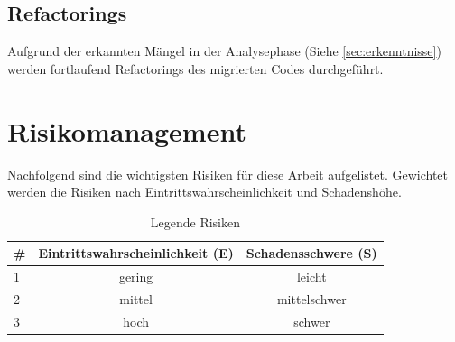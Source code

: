 \documentclass[11pt,a4paper,english,oneside]{book}
\numberwithin{equation}{chapter}
\begin{document}
	\subsection{Refactorings}
	Aufgrund der erkannten Mängel in der Analysephase (Siehe \ref{sec:erkenntnisse}) werden fortlaufend Refactorings des migrierten Codes durchgeführt.

	\section{Risikomanagement}
	Nachfolgend sind die wichtigsten Risiken für diese Arbeit aufgelistet. Gewichtet werden die Risiken nach Eintrittswahrscheinlichkeit und Schadenshöhe. \cite{risikomanagement}
	
	\begin{table}[h!]
		\centering
		\begin{tabular}{l c c}
			\toprule 
			\# & Eintrittswahrscheinlichkeit (E) & Schadensschwere (S) \\
			\toprule 
			1 & gering & leicht  \\
			2 & mittel & mittelschwer \\
			3 & hoch & schwer \\
			\bottomrule 
		\end{tabular} 
		\caption{Legende Risiken} 
	\end{table}
\end{document}
